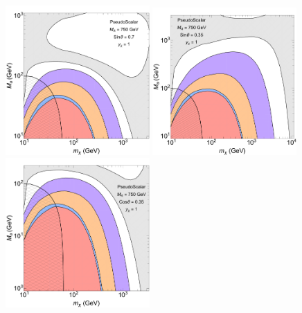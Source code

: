
\begin{figure}[ht]
\begin{center}
\includegraphics[width=0.49\textwidth]{texinputs/06_comparisons/figures/PS_F_S070.pdf}
\includegraphics[width=0.49\textwidth]{texinputs/06_comparisons/figures/PS_F_S035.pdf}\\
\includegraphics[width=0.49\textwidth]{texinputs/06_comparisons/figures/PS_F_C035.pdf}

\end{center}
\end{figure}
